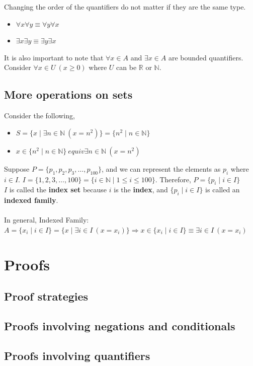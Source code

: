 \documentclass[../setup.tex]{subfiles}
\begin{document}
\begin{remark}
Changing the order of the quantifiers do not matter if they are the same type.
\begin{itemize}
	\item $\forall x\forall y \equiv \forall y\forall x$
	\item $\exists x\exists y \equiv \exists y\exists x$
\end{itemize}
It is also important to note that $\forall x \in A$ and $\exists x \in A$ are bounded quantifiers. Consider $\forall x \in U \ (x\geq 0)$ where $U$ can be $\mathbb{R}$ or $\mathbb{N}$.
\end{remark}


\subsection{More operations on sets}
Consider the following, 
\begin{itemize}
	\item $S = \{x \mid \exists n \in \mathbb{N} \ (x = n^2)\} = \{n^2 \mid n \in \mathbb{N}\}$
	\item $x \in \{n^2 \mid n \in \mathbb{N}\} \ equiv \exists n \in \mathbb{N} \ (x = n^2)$
\end{itemize}
Suppose $P = \{p_1, p_2, p_3, \dots, p_100\}$, and we can represent the elements as $p_i$ where $i \in I$. $I = \{1, 2, 3, \dots, 100\} = \{i \in \mathbb{N} \mid 1 \leq i \leq 100\}$. Therefore, $P = \{p_i \mid i \in I\}$ \\
$I$ is called the \textbf{index set} because $i$ is the \textbf{index}, and $\{p_i \mid i \in I\}$ is called an \textbf{indexed family}. \\
\\
In general, Indexed Family: $A = \{x_i \mid i \in I\} = \{x \mid \exists i \in I \ (x = x_i)\} \Rightarrow x \in \{x_i \mid i \in I\} \equiv \exists i \in I \ (x = x_i)$ 

\section{Proofs}
\subsection{Proof strategies}
\subsection{Proofs involving negations and conditionals}
\subsection{Proofs involving quantifiers}
\end{document}
